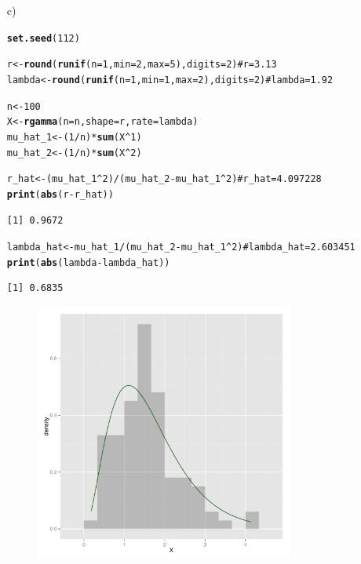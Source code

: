 \documentclass{article}\usepackage{graphicx, color}
\makeatletter
\newcommand{\hlfunctioncall}[1]{\textcolor[rgb]{0.501960784313725,0,0.329411764705882}{\textbf{#1}}}%
\newcommand{\hlcomment}[1]{\textcolor[rgb]{0.180392156862745,0.6,0.341176470588235}{#1}}%
\newenvironment{kframe}{%
 \def\at@end@of@kframe{}%
 \ifinner\ifhmode%
  \def\at@end@of@kframe{\end{minipage}}%
  \begin{minipage}{\columnwidth}%
 \fi\fi%
 \def\FrameCommand##1{\hskip\@totalleftmargin \hskip-\fboxsep
 \colorbox{shadecolor}{##1}\hskip-\fboxsep
     \hskip-\linewidth \hskip-\@totalleftmargin \hskip\columnwidth}%
 \MakeFramed {\advance\hsize-\width
   \@totalleftmargin\z@ \linewidth\hsize
   \@setminipage}}%
 {\par\unskip\endMakeFramed%
 \at@end@of@kframe}
\newenvironment{knitrout}{}{} %
\makeatother
\begin{document}
\begin{enumerate}
\item[c)]
\begin{knitrout}
\color{fgcolor}\begin{kframe}
\begin{alltt}
\hlfunctioncall{set.seed}(112)

r <- \hlfunctioncall{round}(\hlfunctioncall{runif}(n = 1, min = 2, max = 5), digits = 2)  \hlcomment{# r = 3.13}
lambda <- \hlfunctioncall{round}(\hlfunctioncall{runif}(n = 1, min = 1, max = 2), digits = 2)  \hlcomment{# lambda = 1.92}

n <- 100
X <- \hlfunctioncall{rgamma}(n = n, shape = r, rate = lambda)
mu_hat_1 <- (1/n) * \hlfunctioncall{sum}(X^1)
mu_hat_2 <- (1/n) * \hlfunctioncall{sum}(X^2)

r_hat <- (mu_hat_1^2)/(mu_hat_2 - mu_hat_1^2)  \hlcomment{# r_hat = 4.097228}
\hlfunctioncall{print}(\hlfunctioncall{abs}(r - r_hat))
\end{alltt}
\begin{verbatim}
[1] 0.9672
\end{verbatim}
\begin{alltt}
lambda_hat <- mu_hat_1/(mu_hat_2 - mu_hat_1^2)  \hlcomment{# lambda_hat = 2.603451}
\hlfunctioncall{print}(\hlfunctioncall{abs}(lambda - lambda_hat))
\end{alltt}
\begin{verbatim}
[1] 0.6835
\end{verbatim}
\end{kframe}
\end{knitrout}


\begin{figure}[htb]
\centering
\begin{knitrout}
\color{fgcolor}\includegraphics[width=0.8\textwidth]{figure/plots} 
\end{knitrout}


\end{figure}
\end{enumerate}
\end{document}
